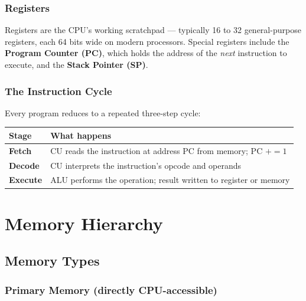 \documentclass[oneside]{book}
\begin{document}
\subsection*{Registers}

Registers are the CPU's working scratchpad --- typically 16 to 32 general-purpose
registers, each 64 bits wide on modern processors.  Special registers include the
\textbf{Program Counter (PC)}, which holds the address of the \emph{next}
instruction to execute, and the \textbf{Stack Pointer (SP)}.

\subsection*{The Instruction Cycle}

Every program reduces to a repeated three-step cycle:

\begin{center}
\begin{tabularx}{0.72\linewidth}{lX}
\toprule
\textbf{Stage} & \textbf{What happens} \\
\midrule
\textbf{Fetch}   & CU reads the instruction at address PC from memory; PC $\mathrel{+}= 1$ \\
\textbf{Decode}  & CU interprets the instruction's opcode and operands \\
\textbf{Execute} & ALU performs the operation; result written to register or memory \\
\bottomrule
\end{tabularx}
\end{center}


\chapter{Memory Hierarchy}

\section{Memory Types}

\subsection*{Primary Memory (directly CPU-accessible)}
\end{document}
